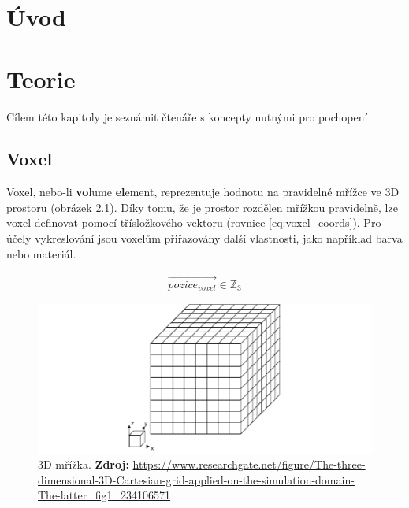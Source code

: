 

\chapter{Úvod}
\label{uvod}

\chapter{Teorie}
\label{teorie}
Cílem této kapitoly je seznámit čtenáře s koncepty nutnými pro pochopení 

\section{Voxel}
Voxel, nebo-li \textbf{vo}lume \textbf{el}ement, reprezentuje hodnotu na pravidelné mřížce ve 3D prostoru (obrázek \ref{fig:3d_grid}). Díky tomu, že je prostor rozdělen mřížkou pravidelně, lze voxel definovat pomocí třísložkového vektoru (rovnice \ref{eq:voxel_coords}). Pro účely vykreslování jsou voxelům přiřazovány další vlastnosti, jako například barva nebo materiál.

\begin{equation} \label{eq:voxel_coords}
\begin{gathered}
\vec{pozice_{voxel}} \in \mathbb{Z}_3
\end{gathered}
\end{equation}

\begin{figure}[H]
    \centering
    \includegraphics[scale=0.5]{obrazky-figures/3d_grid.png}
    \caption{3D mřížka. \textbf{Zdroj: }\url{https://www.researchgate.net/figure/The-three-dimensional-3D-Cartesian-grid-applied-on-the-simulation-domain-The-latter_fig1_234106571}}
    \label{fig:3d_grid}
\end{figure}

